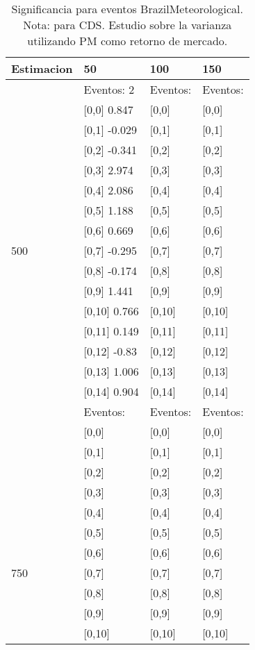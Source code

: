 \begin{table}

\caption{Significancia para eventos BrazilMeteorological. Nota: para CDS. Estudio sobre la varianza utilizando PM como retorno de mercado.}
\centering
\begin{tabular}[t]{llll}
\toprule
Estimacion & 50 & 100 & 150\\
\midrule
 & Eventos:  2 & Eventos: & Eventos:\\
 & {}[0,0] 0.847 & {}[0,0] & {}[0,0]\\
 & {}[0,1] -0.029 & {}[0,1] & {}[0,1]\\
 & {}[0,2] -0.341 & {}[0,2] & {}[0,2]\\
 & {}[0,3] 2.974 & {}[0,3] & {}[0,3]\\
\addlinespace
 & {}[0,4] 2.086 & {}[0,4] & {}[0,4]\\
 & {}[0,5] 1.188 & {}[0,5] & {}[0,5]\\
 & {}[0,6] 0.669 & {}[0,6] & {}[0,6]\\
500 & {}[0,7] -0.295 & {}[0,7] & {}[0,7]\\
 & {}[0,8] -0.174 & {}[0,8] & {}[0,8]\\
\addlinespace
 & {}[0,9] 1.441 & {}[0,9] & {}[0,9]\\
 & {}[0,10] 0.766 & {}[0,10] & {}[0,10]\\
 & {}[0,11] 0.149 & {}[0,11] & {}[0,11]\\
 & {}[0,12] -0.83 & {}[0,12] & {}[0,12]\\
 & {}[0,13] 1.006 & {}[0,13] & {}[0,13]\\
\addlinespace
 & {}[0,14] 0.904 & {}[0,14] & {}[0,14]\\
 & Eventos: & Eventos: & Eventos:\\
 & {}[0,0] & {}[0,0] & {}[0,0]\\
 & {}[0,1] & {}[0,1] & {}[0,1]\\
 & {}[0,2] & {}[0,2] & {}[0,2]\\
\addlinespace
 & {}[0,3] & {}[0,3] & {}[0,3]\\
 & {}[0,4] & {}[0,4] & {}[0,4]\\
 & {}[0,5] & {}[0,5] & {}[0,5]\\
 & {}[0,6] & {}[0,6] & {}[0,6]\\
750 & {}[0,7] & {}[0,7] & {}[0,7]\\
\addlinespace
 & {}[0,8] & {}[0,8] & {}[0,8]\\
 & {}[0,9] & {}[0,9] & {}[0,9]\\
 & {}[0,10] & {}[0,10] & {}[0,10]\\

\end{tabular}
\end{table}
